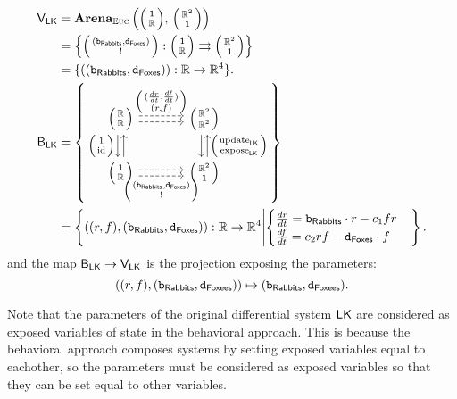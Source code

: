 \documentclass[DynamicalBook]{subfiles}
\begin{document}
\begin{example}
\begin{align*}
  \Set{V}_{\Sys{LK}} &= \Cat{Arena}_{\eucdiff}\left( \littlelens{\ord{1}}{\rr},\,
                       \littlelens{\rr^2}{\ord{1}} \right)\\
                     &= \left\{
\lens{(\const{b}_{\Sys{Rabbits}}, \const{d}_{\Sys{Foxes}})}{!} : \lens{\ord{1}}{\rr} \rightrightarrows \lens{\rr^2}{\ord{1}}
                       \right\} \\
  &= \{((\const{b}_{\Sys{Rabbits}}, \const{d}_{\Sys{Foxes}})) : \rr \to \rr^4\}.\\
  \Set{B}_{\Sys{LK}} &= \left\{
    \begin{tikzcd}[ampersand replacement = \&, column sep = large]
      \lens{\rr}{\rr} \ar[r, shift left, dashed, "\lens{(\frac{dr}{dt}, \frac{df}{dt})}{(r, f)}"] \ar[r, dashed, shift right] \ar[d, shift right,
      "\lens{1}{\id}"'] \ar[d, shift left, leftarrow] \&
      \lens{\rr^2}{\rr^2} \ar[d, shift left, leftarrow,
      "\lens{\update{LK}}{\expose{LK}}"] \ar[d, shift right]\\
      \lens{\ord{1}}{\rr} \ar[r, dashed, shift right, "{\lens{(\const{b}_{\Sys{Rabbits}}, \const{d}_{\Sys{Foxes}})}{!}}"'] \ar[r, dashed,
      shift left] \& \lens{\rr^2}{\ord{1}}
    \end{tikzcd} 
  \right\} \\
  &= \left\{((r, f),(\const{b}_{\Sys{Rabbits}}, \const{d}_{\Sys{Foxes}})) : \rr \to \rr^4 \middle| \begin{cases}
\frac{dr}{dt} =  \const{b}_{\Sys{Rabbits}}
\cdot r - c_1 f r \\
\frac{df}{dt} = c_2 r f - \const{d}_{\Sys{Foxes}}
\cdot f
  \end{cases}\right\}.\\
\end{align*}
and the map $\mathsf{B}_{\mathsf{LK}} \to \mathsf{V}_{\mathsf{LK}}$ is the projection
exposing the parameters:
\[
((r, f), (\mathtt{b}_{\mathsf{Rabbits}},
\mathtt{d}_{\mathsf{Foxees}})) \mapsto (\mathtt{b}_{\mathsf{Rabbits}},
\mathtt{d}_{\mathsf{Foxees}}).
\]
\end{example}
\begin{remark}
Note
that the parameters of the original differential system
$\mathsf{LK}$ are considered as exposed variables of state in the behavioral
approach. This is because the behavioral approach composes systems by setting
exposed variables equal to eachother, so the parameters must be considered as
exposed variables so that they can be set equal to other variables.
\end{remark}
\end{document}

